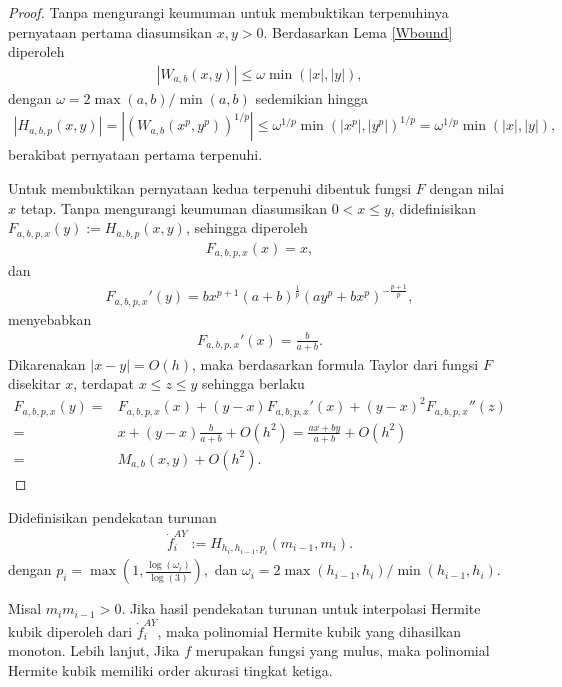 \begin{proof}
    Tanpa mengurangi keumuman untuk membuktikan terpenuhinya pernyataan pertama diasumsikan $x,y > 0$. Berdasarkan Lema \ref{Wbound} diperoleh
    \begin{align*}
        |W_{a,b}(x,y)| \leq \omega \min(|x|,|y|),
    \end{align*}
    dengan $\omega = 2 \max(a,b)/\min(a,b)$ sedemikian hingga
    \begin{align*}
        |H_{a,b,p}(x,y)|=|(W_{a,b}(x^p,y^p))^{1/p}|\leq \omega^{1/p}\min(|x^p|,|y^p|)^{1/p} = \omega^{1/p}\min(|x|,|y|),
    \end{align*}
    berakibat pernyataan pertama terpenuhi.

    Untuk membuktikan pernyataan kedua terpenuhi dibentuk fungsi $F$ dengan nilai $x$ tetap. Tanpa mengurangi keumuman diasumsikan $0 < x \leq y$, didefinisikan $F_{a,b,p,x}(y) := H_{a,b,p}(x,y)$, sehingga diperoleh
    \begin{align*}
        F_{a,b,p,x}(x)=x,
    \end{align*}
    dan
    \begin{align*}
        F_{a,b,p,x}'(y) = bx^{p+1}(a+b)^{\frac{1}{p}}(ay^p + bx^p)^{-\frac{p+1}{p}},
    \end{align*}
    menyebabkan
    \begin{align*}
        F_{a,b,p,x}'(x)=\frac{b}{a+b}.
    \end{align*}
    Dikarenakan $|x-y|=O(h)$, maka berdasarkan formula Taylor dari fungsi $F$ disekitar $x$, terdapat $x \leq z \leq y$ sehingga berlaku
    \begin{align*}
        F_{a,b,p,x}(y) =& F_{a,b,p,x}(x) + (y-x)F_{a,b,p,x}'(x) + (y-x)^2F_{a,b,p,x}''(z) \\
        =& x + (y-x)\frac{b}{a+b} + O(h^2) = \frac{ax + by}{a+b} + O(h^2)\\
        =& M_{a,b}(x,y) + O(h^2).
    \end{align*}
\end{proof}

Didefinisikan pendekatan turunan
\begin{align}
    \dot{f}_i^{AY} := H_{h_i,h_{i-1},p_i}(m_{i-1},m_i). \label{dotf_AY}
\end{align}
dengan $p_i=\max(1,\frac{\log(\omega_i)}{\log(3)}),$ dan $\omega_i=2\max(h_{i-1},h_i)/\min(h_{i-1},h_i)$.

\begin{teorema}
    Misal $m_im_{i-1} > 0$. Jika hasil pendekatan turunan untuk interpolasi Hermite kubik diperoleh dari $\dot{f}_i^{AY}$, maka polinomial Hermite kubik yang dihasilkan monoton. Lebih lanjut, Jika $f$ merupakan fungsi yang mulus, maka polinomial Hermite kubik memiliki order akurasi tingkat ketiga.
\end{teorema}

